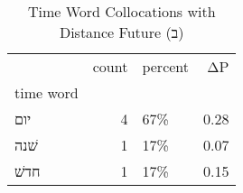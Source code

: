 \begin{table}[htbp!]
\centering
\caption{Time Word Collocations with Distance Future (ב)}
\label{table:distfutב_head_cpd}
\begin{tabular}{lrlr}
\toprule
{} &  count & percent &    ΔP \\
time word &        &         &       \\
\midrule
יום       &      4 &     67\% &  0.28 \\
שׁנה      &      1 &     17\% &  0.07 \\
חדשׁ      &      1 &     17\% &  0.15 \\
\bottomrule
\end{tabular}
\end{table}
